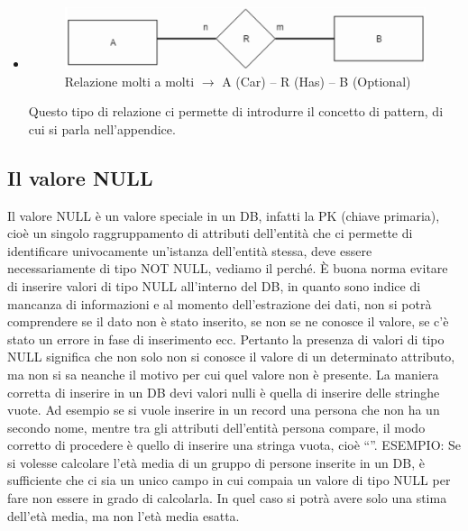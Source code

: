 \begin{itemize}
\item{}

\begin{center}
\begin{figure}[H]
\centering
\includegraphics[scale=1]{figures/ERnm.png}
\caption{Relazione molti a molti $\rightarrow$ A (Car) – R (Has) – B (Optional)} 
\end{figure}
\end{center}

Questo tipo di relazione ci permette di introdurre il concetto di pattern, di cui si parla nell’appendice. 

\end{itemize}

\subsection{Il valore NULL}

Il valore NULL è un valore speciale in un DB, infatti la PK (chiave primaria), cioè un singolo raggruppamento di attributi dell’entità che ci permette di identificare univocamente un’istanza dell’entità stessa, deve essere necessariamente di tipo NOT NULL, vediamo il perché.  
È buona norma evitare di inserire valori di tipo NULL all’interno del DB, in quanto sono indice di mancanza di informazioni e al momento dell’estrazione dei dati, non si potrà comprendere se il dato non è stato inserito, se non se ne conosce il valore, se c’è stato un errore in fase di inserimento ecc. 
Pertanto la presenza di valori di tipo NULL significa che non solo non si conosce il valore di un determinato attributo, ma non si sa neanche il motivo per cui quel valore non è presente.  
La maniera corretta di inserire in un DB devi valori nulli è quella di inserire delle stringhe vuote. Ad esempio se si vuole inserire in un record una persona che non ha un secondo nome, mentre tra gli attributi dell’entità persona compare, il modo corretto di procedere è quello di inserire una stringa vuota, cioè “”. 
ESEMPIO: Se si volesse calcolare l’età media di un gruppo di persone inserite in un DB, è sufficiente che ci sia un unico campo in cui compaia un valore di tipo NULL per fare non essere in grado di calcolarla. In quel caso si potrà avere solo una stima dell’età media, ma non l’età media esatta.

